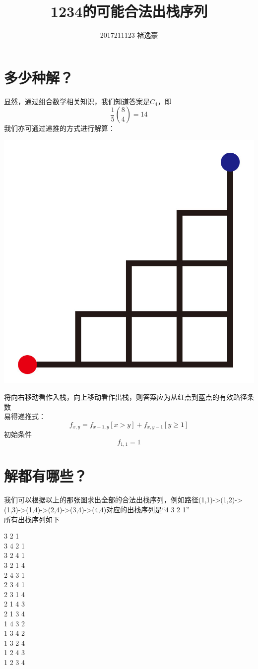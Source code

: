 \documentclass[UTF8]{ctexart}
\author{2017211123 褚逸豪}
\title{1234的可能合法出栈序列}
\begin{document}
\maketitle
\section{多少种解？}
显然，通过组合数学相关知识，我们知道答案是$C_4$，即
$$\frac{1}{5}\binom 8 4=14$$
我们亦可通过递推的方式进行解算：
\begin{center}
\includegraphics[scale=0.5]{sample.jpg}
\end{center}
将向右移动看作入栈，向上移动看作出栈，则答案应为从红点到蓝点的有效路径条数\\
易得递推式：
$$f_{x,y} = f_{x-1,y}[x>y]+f_{x,y-1}[y \geqslant 1]$$
初始条件
$$f_{1,1}=1$$
\section{解都有哪些？}
我们可以根据以上的那张图求出全部的合法出栈序列，例如路径(1,1)->(1,2)->(1,3)->(1,4)->(2,4)->(3,4)->(4,4)对应的出栈序列是“4 3 2 1”\\
所有出栈序列如下
\begin{multicols}{2}\begin{center} 3 2 1\\
3 4 2 1\\
3 2 4 1\\
3 2 1 4\\
2 4 3 1\\
2 3 4 1\\
2 3 1 4\\
2 1 4 3\\
2 1 3 4\\
1 4 3 2\\
1 3 4 2\\
1 3 2 4\\
1 2 4 3\\
1 2 3 4\end{center}
\end{multicols}
\end{document}

